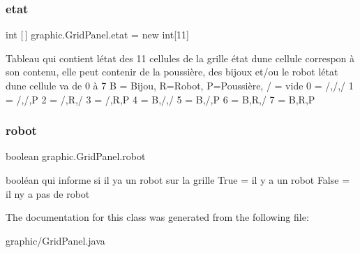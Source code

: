 \subsubsection{\texorpdfstring{etat}{etat}}
{\footnotesize\ttfamily int \mbox{[}$\,$\mbox{]} graphic.\+Grid\+Panel.\+etat = new int\mbox{[}11\mbox{]}}

Tableau qui contient l\textquotesingle{}état des 11 cellules de la grille état d\textquotesingle{}une cellule correspon à son contenu, elle peut contenir de la poussière, des bijoux et/ou le robot l\textquotesingle{}état d\textquotesingle{}une cellule va de 0 à 7 B = Bijou, R=Robot, P=Poussière, / = vide 0 = /,/,/ 1 = /,/,P 2 = /,R,/ 3 = /,R,P 4 = B,/,/ 5 = B,/,P 6 = B,R,/ 7 = B,R,P \hypertarget{classgraphic_1_1_grid_panel_a6c9676cf3ad0b634aea1c48b745d5046}{}\label{classgraphic_1_1_grid_panel_a6c9676cf3ad0b634aea1c48b745d5046} 
\subsubsection{\texorpdfstring{robot}{robot}}
{\footnotesize\ttfamily boolean graphic.\+Grid\+Panel.\+robot}

booléan qui informe si il y\textquotesingle{}a un robot sur la grille True = il y a un robot False = il n\textquotesingle{}y a pas de robot 

The documentation for this class was generated from the following file\+:\begin{DoxyCompactItemize}
\item 
graphic/Grid\+Panel.\+java\end{DoxyCompactItemize}
